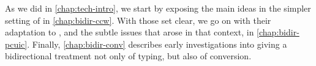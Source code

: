  

As we did in \cref{chap:tech-intro}, we start by exposing the main ideas in the
simpler setting of  in \cref{chap:bidir-ccw}.
With those set clear, we go on with their adaptation to , and the subtle
issues that arose in that context, in \cref{chap:bidir-pcuic}.
Finally, \cref{chap:bidir-conv} describes early investigations into giving a
bidirectional treatment not only of typing, but also of conversion.

